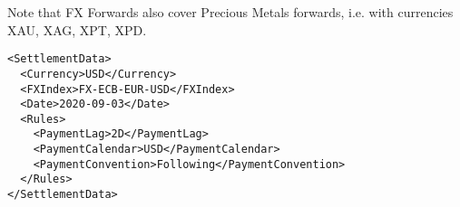 Note that FX Forwards also cover Precious Metals forwards, i.e. with
currencies XAU, XAG, XPT, XPD.

\begin{listing}[H]
\begin{verbatim}
<SettlementData>
  <Currency>USD</Currency>
  <FXIndex>FX-ECB-EUR-USD</FXIndex>
  <Date>2020-09-03</Date>
  <Rules>
    <PaymentLag>2D</PaymentLag>
    <PaymentCalendar>USD</PaymentCalendar>
    <PaymentConvention>Following</PaymentConvention>
  </Rules>
</SettlementData>
\end{verbatim}
\caption{Example \lstinline!SettlementData! node with \lstinline!Rules! sub-node}
\label{lst:settlement_data_node}
\end{listing}